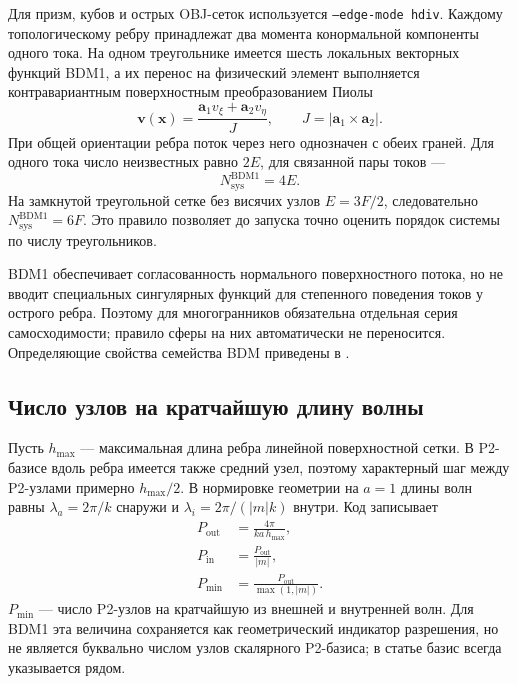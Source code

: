 \documentclass[12pt,a4paper]{article}
\newcommand{\vx}{\mathbf{x}}
\begin{document}
Для призм, кубов и острых OBJ-сеток используется \texttt{--edge-mode hdiv}.
Каждому топологическому ребру принадлежат два момента конормальной компоненты
одного тока. На одном треугольнике имеется шесть локальных векторных функций
BDM1, а их перенос на физический элемент выполняется контравариантным
поверхностным преобразованием Пиолы
\begin{equation}
  \mathbf v(\vx)=
  \frac{\mathbf a_1 v_{\xi}+\mathbf a_2 v_{\eta}}{J},
  \qquad
  J=|\mathbf a_1\times\mathbf a_2|.
\end{equation}
При общей ориентации ребра поток через него однозначен с обеих граней. Для
одного тока число неизвестных равно $2E$, для связанной пары токов ---
\begin{equation}
  N_{\mathrm{sys}}^{\mathrm{BDM1}}=4E.
  \label{eq:bdm-dofs}
\end{equation}
На замкнутой треугольной сетке без висячих узлов $E=3F/2$, следовательно
$N_{\mathrm{sys}}^{\mathrm{BDM1}}=6F$. Это правило позволяет до запуска точно
оценить порядок системы по числу треугольников.

BDM1 обеспечивает согласованность нормального поверхностного потока, но не
вводит специальных сингулярных функций для степенного поведения токов у
острого ребра. Поэтому для многогранников обязательна отдельная серия
самосходимости; правило сферы на них автоматически не переносится.
Определяющие свойства семейства BDM приведены в \cite{brezzi1985}.

\subsection{Число узлов на кратчайшую длину волны}

Пусть $h_{\max}$ --- максимальная длина ребра линейной поверхностной сетки.
В P2-базисе вдоль ребра имеется также средний узел, поэтому характерный шаг
между P2-узлами примерно $h_{\max}/2$. В нормировке геометрии на $a=1$ длины
волн равны $\lambda_a=2\pi/k$ снаружи и $\lambda_i=2\pi/(|m|k)$ внутри. Код
записывает
\begin{align}
  P_{\mathrm{out}} &= \frac{4\pi}{ka\,h_{\max}},\\
  P_{\mathrm{in}}  &= \frac{P_{\mathrm{out}}}{|m|},\\
  P_{\min} &= \frac{P_{\mathrm{out}}}{\max(1,|m|)}.
  \label{eq:ppw}
\end{align}
$P_{\min}$ --- число P2-узлов на кратчайшую из внешней и внутренней волн.
Для BDM1 эта величина сохраняется как геометрический индикатор разрешения, но
не является буквально числом узлов скалярного P2-базиса; в статье базис всегда
указывается рядом.
\end{document}
